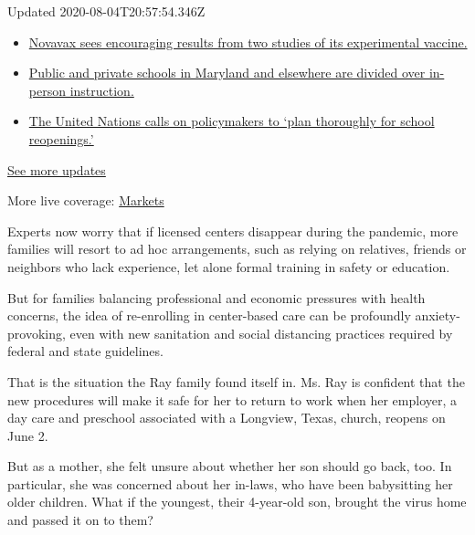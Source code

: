 Updated 2020-08-04T20:57:54.346Z

\begin{itemize}
\tightlist
\item
  \href{https://www.nytimes.com/2020/08/04/world/coronavirus-cases.html?action=click\&pgtype=Article\&state=default\&region=MAIN_CONTENT_1\&context=storylines_live_updates\#link-1228a480}{Novavax
  sees encouraging results from two studies of its experimental
  vaccine.}
\item
  \href{https://www.nytimes.com/2020/08/04/world/coronavirus-cases.html?action=click\&pgtype=Article\&state=default\&region=MAIN_CONTENT_1\&context=storylines_live_updates\#link-4825b93}{Public
  and private schools in Maryland and elsewhere are divided over
  in-person instruction.}
\item
  \href{https://www.nytimes.com/2020/08/04/world/coronavirus-cases.html?action=click\&pgtype=Article\&state=default\&region=MAIN_CONTENT_1\&context=storylines_live_updates\#link-50f7386d}{The
  United Nations calls on policymakers to `plan thoroughly for school
  reopenings.'}
\end{itemize}

\href{https://www.nytimes.com/2020/08/04/world/coronavirus-cases.html?action=click\&pgtype=Article\&state=default\&region=MAIN_CONTENT_1\&context=storylines_live_updates}{See
more updates}

More live coverage:
\href{https://www.nytimes.com/live/2020/08/04/business/stock-market-today-coronavirus?action=click\&pgtype=Article\&state=default\&region=MAIN_CONTENT_1\&context=storylines_live_updates}{Markets}

Experts now worry that if licensed centers disappear during the
pandemic, more families will resort to ad hoc arrangements, such as
relying on relatives, friends or neighbors who lack experience, let
alone formal training in safety or education.

But for families balancing professional and economic pressures with
health concerns, the idea of re-enrolling in center-based care can be
profoundly anxiety-provoking, even with new sanitation and social
distancing practices required by federal and state guidelines.

That is the situation the Ray family found itself in. Ms. Ray is
confident that the new procedures will make it safe for her to return to
work when her employer, a day care and preschool associated with a
Longview, Texas, church, reopens on June 2.

But as a mother, she felt unsure about whether her son should go back,
too. In particular, she was concerned about her in-laws, who have been
babysitting her older children. What if the youngest, their 4-year-old
son, brought the virus home and passed it on to them?

